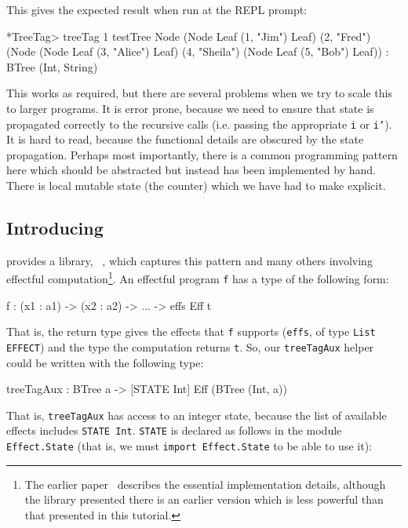 \noindent
This gives the expected result when run at the \Idris{} REPL prompt:

\begin{code}
*TreeTag> treeTag 1 testTree 
Node (Node Leaf (1, "Jim") Leaf)
     (2, "Fred")
     (Node (Node Leaf (3, "Alice") Leaf)
           (4, "Sheila")
           (Node Leaf (5, "Bob") Leaf)) : BTree (Int, String)
\end{code}

\noindent
This works as required, but there are several problems when we try to scale
this to larger programs. It is error prone, because we need to ensure that
state is propagated correctly to the recursive calls (i.e. passing the
appropriate \texttt{i} or \texttt{i'}). It is hard to read, because the
functional details are obscured by the state propagation. Perhaps most
importantly, there is a common programming pattern here which should be
abstracted but instead has been implemented by hand. There is local mutable
state (the counter) which we have had to make explicit.

\subsection{Introducing \effects{}}

\Idris{} provides a library, \effects{}~\cite{brady-icfp2013}, which captures
this pattern and many others involving effectful computation\footnote{The
earlier paper~\cite{brady-icfp2013} describes the essential implementation
details, although the library presented there is an earlier version which is
less powerful than that presented in this tutorial.}. An effectful program
\texttt{f} has a type of the following form:

\begin{code}
f : (x1 : a1) -> (x2 : a2) -> ... -> { effs } Eff t
\end{code}

\noindent
That is, the return type gives the effects that \texttt{f} supports
(\texttt{effs}, of type \texttt{List EFFECT}) and the
type the computation returns \texttt{t}. 
So, our
\texttt{treeTagAux} helper could be written with the following type:

\begin{code}
treeTagAux : BTree a -> { [STATE Int] } Eff (BTree (Int, a))
\end{code}

\noindent
That is, \texttt{treeTagAux} has access to an integer state, because the
list of available effects includes \texttt{STATE Int}. \texttt{STATE} is
declared as follows in the module \texttt{Effect.State} (that is, we must
\texttt{import Effect.State} to be able to use it):

